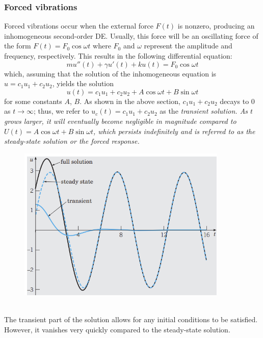 \documentclass{article}
\begin{document}
\subsubsection{Forced vibrations} \normalfont Forced vibrations occur when the external force $F(t)$ is nonzero, producing an inhomogeneous second-order DE. Usually, this force will be an oscillating force of the form $F(t) = F_0 \cos \omega t$ where $F_0$ and $\omega$ represent the amplitude and frequency, respectively. This results in the following differential equation:
\begin{equation*}
    mu''(t) + \gamma u'(t) + ku(t) = F_0 \cos \omega t
\end{equation*}
which, assuming that the solution of the inhomogeneous equation is $u = c_1u_1 + c_2u_2$, yields the solution
\begin{equation*}
    u(t) = c_1u_1 + c_2u_2 + A\cos\omega t + B\sin\omega t
\end{equation*}
for some constants $A$, $B$. As shown in the above section, $c_1u_1 + c_2u_2$ decays to 0 as $t \to \infty$; thus, we refer to $u_c(t) = c_1u_1 + c_2u_2$ as the \it transient solution. \normalfont As $t$ grows larger, it will eventually become negligible in magnitude compared to $U(t) = A \cos \omega t + B\sin \omega t$, which persists indefinitely and is referred to as the \it steady-state solution \normalfont or the \it forced response\normalfont.
\begin{figure}[h]
    \centering
    \includegraphics[width=10cm]{DE-ch3-transient.png}
\end{figure} \\
The transient part of the solution allows for any initial conditions to be satisfied. However, it vanishes very quickly compared to the steady-state solution.
\end{document}
